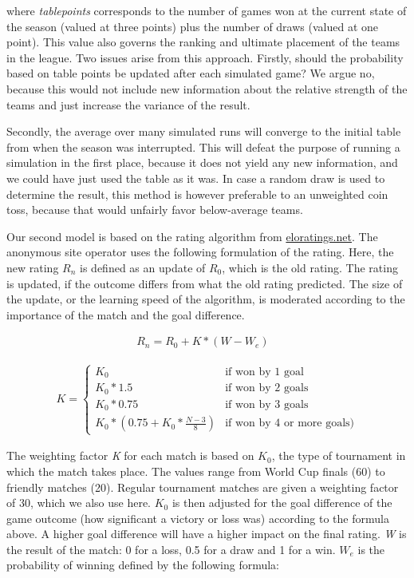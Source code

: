 \documentclass[12pt,a4paper]{article}
\begin{document}
where \emph{tablepoints} corresponds to the number of games won at the
current state of the season (valued at three points) plus the number of
draws (valued at one point). This value also governs the ranking and
ultimate placement of the teams in the league. Two issues arise from
this approach. Firstly, should the probability based on table points be
updated after each simulated game? We argue no, because this would not
include new information about the relative strength of the teams and
just increase the variance of the result.

Secondly, the average over many simulated runs will converge to the
initial table from when the season was interrupted. This will defeat the
purpose of running a simulation in the first place, because it does not
yield any new information, and we could have just used the table as it
was. In case a random draw is used to determine the result, this method
is however preferable to an unweighted coin toss, because that would
unfairly favor below-average teams.

Our second model is based on the rating algorithm from
\href{eloratings.net/about}{eloratings.net}. The anonymous site operator
uses the following formulation of the rating. Here, the new rating
\(R_n\) is defined as an update of \(R_0\), which is the old rating. The
rating is updated, if the outcome differs from what the old rating
predicted. The size of the update, or the learning speed of the
algorithm, is moderated according to the importance of the match and the
goal difference.

\begin{align}
R_n = R_0 + K * (W - W_e) &
\end{align}

\begin{align}
K = \begin{cases}
    K_0         &\mbox{if won by 1 goal} \\
    K_0 * 1.5   &\mbox{if won by 2 goals} \\
    K_0 * 0.75  &\mbox{if won by 3 goals} \\
    K_0 * \left( 0.75 + K_0 * \frac{N-3}{8} \right) &\mbox{if won by 4 or more goals})
  \end{cases}
\end{align}

The weighting factor \emph{K} for each match is based on \(K_0\), the
type of tournament in which the match takes place. The values range from
World Cup finals (60) to friendly matches (20). Regular tournament
matches are given a weighting factor of 30, which we also use here.
\(K_0\) is then adjusted for the goal difference of the game outcome
(how significant a victory or loss was) according to the formula above.
A higher goal difference will have a higher impact on the final rating.
\emph{W} is the result of the match: 0 for a loss, 0.5 for a draw and 1
for a win. \(W_e\) is the probability of winning defined by the
following formula:
\end{document}
